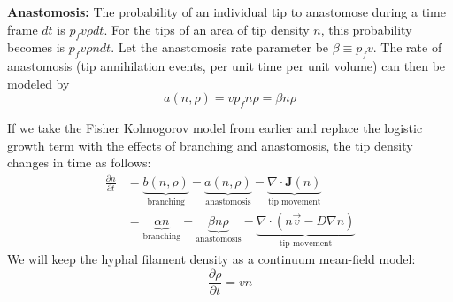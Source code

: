 \documentclass{article}
\begin{document}
\textbf{Anastomosis: } The probability of an individual tip to anastomose during a time frame $dt$ is $p_f v \rho dt$. For the tips of an area of tip density $n$, this probability becomes is $p_f v \rho n dt$. Let the anastomosis rate parameter be $\beta \equiv p_f v$. The rate of anastomosis (tip annihilation events, per unit time per unit volume) can then be modeled by \[ a(n,\rho) = v p_f n \rho = \beta n \rho \] 

If we take the Fisher Kolmogorov model from earlier and replace the logistic growth term with the effects of branching and anastomosis, the tip density changes in time as follows:
\begin{align*}
    \frac{\partial n}{\partial t} &= \underbrace{b(n,\rho)}_{\text{branching}} - \underbrace{a(n,\rho)}_{\text{anastomosis}} -\underbrace{\nabla \cdot \mathbf{J}(n)}_{\text{tip movement}} \\
    &= \underbrace{\alpha n}_{\text{branching}} - \underbrace{\beta n \rho}_{\text{anastomosis}} -\underbrace{\nabla \cdot ( n\vec{v} -D\nabla n)}_{\text{tip movement}}
\end{align*}
We will keep the hyphal filament density as a continuum mean-field model:
\[ \frac{\partial\rho}{\partial t} = vn \]
\end{document}
